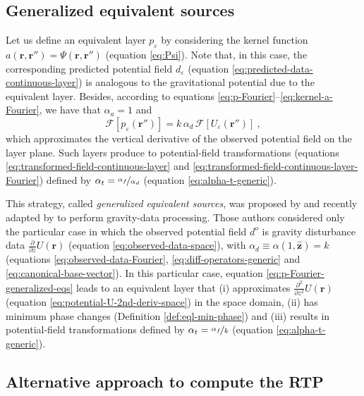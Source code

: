 \subsection{Generalized equivalent sources}

Let us define an equivalent layer $p_{\varepsilon}$ by considering the kernel function 
$a(\mathbf{r}, \mathbf{r}'') = \Psi(\mathbf{r}, \mathbf{r}'')$ (equation \ref{eq:Psi}). 
Note that, in this case, 
the corresponding predicted potential field $d_{\varepsilon}$ (equation \ref{eq:predicted-data-continuous-layer}) 
is analogous to the gravitational potential due to the equivalent layer.
Besides, according to equations \ref{eq:p-Fourier}--\ref{eq:kernel-a-Fourier}, we have that 
$\alpha_{a} = 1$ and 
\begin{equation}
	\mathcal{F} [ p_{\varepsilon}(\mathbf{r}'') ] =
	k \, \alpha_{d} \, \mathcal{F} \left[ U_{\varepsilon}(\mathbf{r}'') \right]  \: ,
	\label{eq:p-Fourier-generalized-eqs}
\end{equation}
which approximates the vertical derivative of the observed potential field on the layer plane. 
Such layers produce to potential-field transformations (equations \ref{eq:transformed-field-continuous-layer} and 
\ref{eq:transformed-field-continuous-layer-Fourier}) defined by $\alpha_{t} = \nicefrac{\alpha_{f}}{\alpha_{d}}$ (equation \ref{eq:alpha-t-generic}).

This strategy, called \textit{generalized equivalent sources}, was proposed by \citet{cordell1992} and recently adapted by 
\citet{soler_uieda2021} to perform gravity-data processing. 
Those authors considered only the particular case in which the observed potential field $d^{o}$ is gravity disturbance data 
$\tfrac{\partial}{\partial z} U(\mathbf{r})$ (equation \ref{eq:observed-data-space}), 
with $\alpha_{d} \equiv \alpha(1, \hat{\mathbf{z}}) = k$ (equations \ref{eq:observed-data-Fourier}, 
\ref{eq:diff-operators-generic} and \ref{eq:canonical-base-vector}).
In this particular case, equation \ref{eq:p-Fourier-generalized-eqs} leads to an equivalent layer that 
(i) approximates $\tfrac{\partial^{2}}{\partial z^{2}} U(\mathbf{r})$ (equation \ref{eq:potential-U-2nd-deriv-space}) 
in the space domain, 
(ii) has minimum phase changes (Definition \ref{def:eql-min-phase}) and 
(iii) results in potential-field transformations defined by $\alpha_{t} = \nicefrac{\alpha_{f}}{k}$ (equation \ref{eq:alpha-t-generic}).

\subsection{Alternative approach to compute the RTP}

